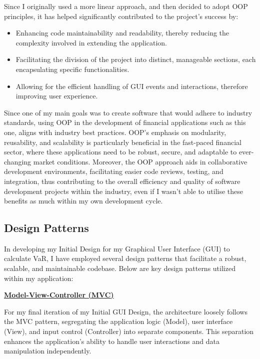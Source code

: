 \documentclass{article}
\begin{document}
Since I originally used a more linear approach, and then decided to adopt OOP principles, it has helped significantly contributed to the project's success by:
\begin{itemize}
    \item Enhancing code maintainability and readability, thereby reducing the complexity involved in extending the application.
    \item Facilitating the division of the project into distinct, manageable sections, each encapsulating specific functionalities.
    \item Allowing for the efficient handling of GUI events and interactions, therefore improving user experience.
\end{itemize}

Since one of my main goals was to create software that would adhere to industry standards, using OOP in the development of financial applications such as this one, aligns with industry best practices. OOP's emphasis on modularity, reusability, and scalability is particularly beneficial in the fast-paced financial sector, where these applications need to be robust, secure, and adaptable to ever-changing market conditions. Moreover, the OOP approach aids in collaborative development environments, facilitating easier code reviews, testing, and integration, thus contributing to the overall efficiency and quality of software development projects within the industry, even if I wasn't able to utilise these benefits as much within my own development cycle.


\subsection{Design Patterns}

In developing my Initial Design for my Graphical User Interface (GUI) to calculate VaR, I have employed several design patterns that facilitate a robust, scalable, and maintainable codebase. Below are key design patterns utilized within my application:\\\vspace{0.3cm}

\underline{\textbf{Model-View-Controller (MVC)}}\\\vspace{0.3cm}

For my final iteration of my Initial GUI Design, the architecture loosely follows the MVC pattern, segregating the application logic (Model), user interface (View), and input control (Controller) into separate components. This separation enhances the application's ability to handle user interactions and data manipulation independently.
\end{document}
